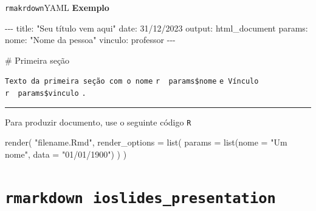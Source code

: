 \documentclass[
  10pt,
  ignorenonframetext,
]{beamer}
\newenvironment{Shaded}{\begin{snugshade}}{\end{snugshade}}
\newcommand{\AttributeTok}[1]{\textcolor[rgb]{0.40,0.45,0.13}{#1}}
\newcommand{\FunctionTok}[1]{\textcolor[rgb]{0.28,0.35,0.67}{#1}}
\newcommand{\NormalTok}[1]{\textcolor[rgb]{0.00,0.23,0.31}{#1}}
\newcommand{\StringTok}[1]{\textcolor[rgb]{0.13,0.47,0.30}{#1}}
\newcommand*{\regrafina}{\rule{\textwidth}{0.5pt}}
\begin{document}
\begin{frame}[fragile]{\texttt{rmakrdown}\newline YAML}
\protect\hypertarget{rmakrdownyaml}{}
\textbf{Exemplo}

\scriptsize

\begin{Shaded}
\begin{Highlighting}[]
\NormalTok{{-}{-}{-}}
\NormalTok{title: "Seu título vem aqui"}
\NormalTok{date: 31/12/2023}
\NormalTok{output: html\_document}
\NormalTok{params:}
\NormalTok{  nome: "Nome da pessoa"}
\NormalTok{  vinculo: professor}
\NormalTok{{-}{-}{-}}

\NormalTok{\# Primeira seção}
\end{Highlighting}
\end{Shaded}

\texttt{Texto\ da\ primeira\ seção\ com\ o\ nome}
\texttt{\textasciigrave{}r\ \ params\$nome\textasciigrave{}}
\texttt{e\ Vínculo}
\texttt{\textasciigrave{}r\ \ params\$vinculo\textasciigrave{}}
\texttt{.}

\regrafina

Para produzir documento, use o seguinte código \texttt{R}

\begin{Shaded}
\begin{Highlighting}[]
\FunctionTok{render}\NormalTok{(}
  \StringTok{"filename.Rmd"}\NormalTok{,}
  \AttributeTok{render\_options =} \FunctionTok{list}\NormalTok{(}
    \AttributeTok{params =} \FunctionTok{list}\NormalTok{(}\AttributeTok{nome =} \StringTok{"Um nome"}\NormalTok{, }\AttributeTok{data =} \StringTok{"01/01/1900"}\NormalTok{)}
\NormalTok{  )}
\NormalTok{)}
\end{Highlighting}
\end{Shaded}

\normalsize
\end{frame}

\hypertarget{rmarkdown-ioslides_presentation}{%
\section{\texorpdfstring{\texttt{rmarkdown}\newline\newline~\texttt{ioslides\_presentation}}{rmarkdown~ioslides\_presentation}}\label{rmarkdown-ioslides_presentation}}
\end{document}
